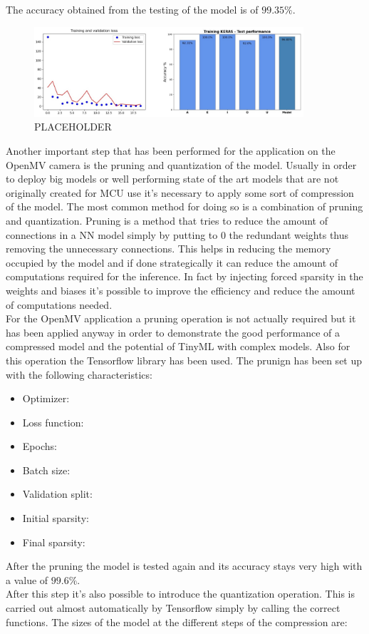 \documentclass[12pt]{report}
\begin{document}
The accuracy obtained from the testing of the model is of $99.35\%$.
%
\begin{figure}[h!]
    \centering
    \includegraphics[width=100mm]{Figures/Chapter4/training_letters.jpg} 
    \caption{PLACEHOLDER}
    \label{fig:training_mnist}    
\end{figure}
%
Another important step that has been performed for the application on the OpenMV camera is the pruning and quantization of the model. Usually in order to deploy big models or well performing state of the art models that are not originally created for MCU use it's necessary to apply some sort of compression of the model. The most common method for doing so is a combination of pruning and quantization. Pruning is a method that tries to reduce the amount of connections in a NN model simply by putting to 0 the redundant weights thus removing the unnecessary connections. This helps in reducing the memory occupied by the model and if done strategically it can reduce the amount of computations required for the inference. In fact by injecting forced sparsity in the weights and biases it's possible to improve the efficiency and reduce the amount of computations needed. \\
For the OpenMV application a pruning operation is not actually required but it has been applied anyway in order to demonstrate the good performance of a compressed model and the potential of TinyML with complex models. Also for this operation the Tensorflow library has been used. The prunign has been set up with the following characteristics:  
\begin{itemize}
	\item Optimizer:
	\item Loss function:
	\item Epochs:
	\item Batch size: 
	\item Validation split: 
	\item Initial sparsity: 
	\item Final sparsity:
\end{itemize}

After the pruning the model is tested again and its accuracy stays very high with a value of $99.6\%$.\\
After this step it's also possible to introduce the quantization operation. This is carried out almost automatically by Tensorflow simply by calling the correct functions. The sizes of the model at the different steps of the compression are: 
\end{document}
